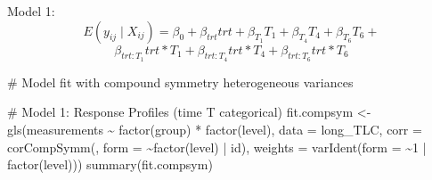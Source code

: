 \documentclass[
  letterpaper,
  DIV=11,
  numbers=noendperiod]{scrreprt}
\newenvironment{Shaded}{\begin{snugshade}}{\end{snugshade}}
\newcommand{\AttributeTok}[1]{\textcolor[rgb]{0.40,0.45,0.13}{#1}}
\newcommand{\CommentTok}[1]{\textcolor[rgb]{0.37,0.37,0.37}{#1}}
\newcommand{\DecValTok}[1]{\textcolor[rgb]{0.68,0.00,0.00}{#1}}
\newcommand{\FunctionTok}[1]{\textcolor[rgb]{0.28,0.35,0.67}{#1}}
\newcommand{\NormalTok}[1]{\textcolor[rgb]{0.00,0.23,0.31}{#1}}
\newcommand{\OtherTok}[1]{\textcolor[rgb]{0.00,0.23,0.31}{#1}}
\newcommand{\SpecialCharTok}[1]{\textcolor[rgb]{0.37,0.37,0.37}{#1}}
\begin{document}
Model 1:
\[E(y_{ij} \mid X_{ij}) = \beta_0 +  \beta_{trt}trt +  \beta_{T_1}T_1 +  \beta_{T_4}T_4 +  \beta_{T_6}T_6 +  \]
\[\beta_{trt:T_1}trt*T_1+ \beta_{trt:T_4}trt*T_4 + \beta_{trt:T_6}trt*T_6\]

\begin{Shaded}
\begin{Highlighting}[]
\CommentTok{\# Model fit with compound symmetry heterogeneous variances}

\CommentTok{\# Model 1: Response Profiles (time T categorical)}
\NormalTok{fit.compsym }\OtherTok{\textless{}{-}} \FunctionTok{gls}\NormalTok{(measurements }\SpecialCharTok{\textasciitilde{}} \FunctionTok{factor}\NormalTok{(group) }\SpecialCharTok{*} \FunctionTok{factor}\NormalTok{(level), }\AttributeTok{data =}\NormalTok{ long\_TLC,}
    \AttributeTok{corr =} \FunctionTok{corCompSymm}\NormalTok{(, }\AttributeTok{form =} \SpecialCharTok{\textasciitilde{}}\FunctionTok{factor}\NormalTok{(level) }\SpecialCharTok{|}\NormalTok{ id), }\AttributeTok{weights =} \FunctionTok{varIdent}\NormalTok{(}\AttributeTok{form =} \SpecialCharTok{\textasciitilde{}}\DecValTok{1} \SpecialCharTok{|}
        \FunctionTok{factor}\NormalTok{(level)))}
\FunctionTok{summary}\NormalTok{(fit.compsym)}
\end{Highlighting}
\end{Shaded}
\end{document}
